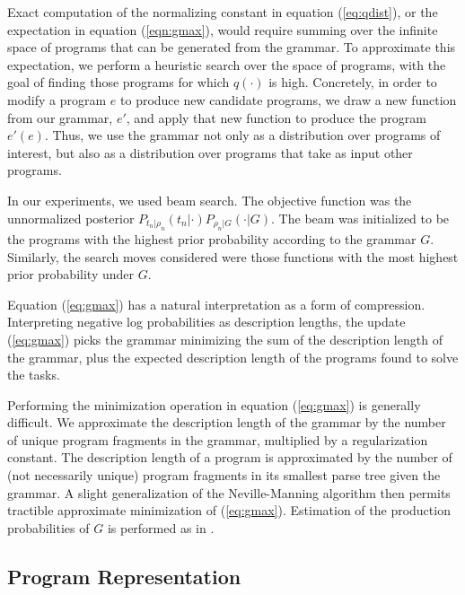 \documentclass{article} %
\begin{document}
Exact computation of the normalizing constant in equation (\ref{eq:qdist}), or the expectation in equation (\ref{eqn:gmax}), would require summing over the infinite space of programs that can be generated from the grammar. To approximate this expectation, we perform a heuristic search over the space of programs, with the goal of finding those programs for which $q(\cdot)$ is high.
Concretely, in order to modify a program $e$ to produce new candidate programs, we draw a new function from our grammar, $e'$, and apply that new function to produce the program $e'(e)$.
Thus, we use the grammar not only as a distribution over programs of interest, but also as a distribution over programs that take as input other programs.

In our experiments, we used beam search. The objective function was the unnormalized posterior $P_{t_n|\rho_n}(t_n | \cdot )P_{\rho_n | G}(\cdot | G)$.
The beam was initialized to be the programs with the highest prior probability according to the grammar $G$.
Similarly, the search moves considered were those functions with the most highest prior probability under $G$.

Equation (\ref{eq:gmax}) has a natural interpretation as a form of compression.
Interpreting negative log probabilities as description lengths, the update (\ref{eq:gmax}) picks the grammar minimizing the sum of the description length of the grammar, plus the expected description length of the programs found to solve the tasks.

Performing the minimization operation in equation (\ref{eq:gmax}) is generally difficult.
We approximate the description length of the grammar by the number of unique program fragments in the grammar, multiplied by a regularization constant.
The description length of a program is approximated by the number of (not necessarily unique) program fragments in its smallest parse tree given the grammar.
A slight generalization of the Neville-Manning algorithm then permits tractible approximate minimization of (\ref{eq:gmax}).
Estimation of the production probabilities of $G$ is performed as in \cite{DBLP:conf/ijcai/DechterMAT13}.

\subsection{Program Representation}
\end{document}
